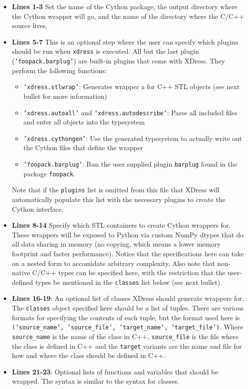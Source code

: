     \begin{itemize}
      \item \textbf{Lines 1-3} Set the name of the Cython package, the output directory where the Cython wrapper will go, and the name of the directory where the C/C++ source lives.
      \item \textbf{Lines 5-7} This is an optional step where the user can specify which plugins should be run when \texttt{xdress} is executed. All but the last plugin (\texttt{'foopack.barplug'}) are built-in plugins that come with XDress.  They perform the following functions:
      \begin{itemize}
        \item \texttt{'xdress.stlwrap'}: Generates wrapper a for C++ STL objects (see next bullet for more information)
        \item \texttt{'xdress.autoall'} and \texttt{'xdress.autodescribe'}: Parse all included files and enter all objects into the typesystem
        \item \texttt{'xdress.cythongen'}: Use the generated typesystem to actually write out the Cython files that define the wrapper
        \item \texttt{'foopack.barplug'}: Run the user supplied plugin \texttt{barplug} found in the package \texttt{foopack}.
      \end{itemize}
      Note that if the \texttt{plugins} list is omitted from this file that XDress will automatically populate this list with the necessary plugins to create the Cython interface.
      \item \textbf{Lines 8-14} Specify which STL containers to create Cython wrappers for. These wrappers will be exposed to Python via custom NumPy dtypes that do all data sharing in memory (no copying, which means a lower memory footprint and faster performance). Notice that the specifications here can take on a nested form to accomidate arbitrary complexity. Also note that non-native C/C++ types can be specified here, with the restriction that the user-defined types be mentioned in the \texttt{classes} list below (see next bullet).
      \item \textbf{Lines 16-19}: An optional list of classes XDress should generate wrappers for. The \texttt{classes} object specified here should be a list of tuples. There are various formats for specifying the contents of each tuple, but the format used here is \texttt{('source\_name', 'source\_file', 'target\_name', 'target\_file')}. Where \texttt{source\_name} is the name of the class in C++, \texttt{source\_file} is the file where the class is defined in C++ and the \texttt{target} variants are the name and file for how and where the class should be defined in C++.
      \item \textbf{Lines 21-23}: Optional lists of functions and variables that should be wrapped. The syntax is similar to the syntax for classes.
    \end{itemize}
    \mainstretch{}

